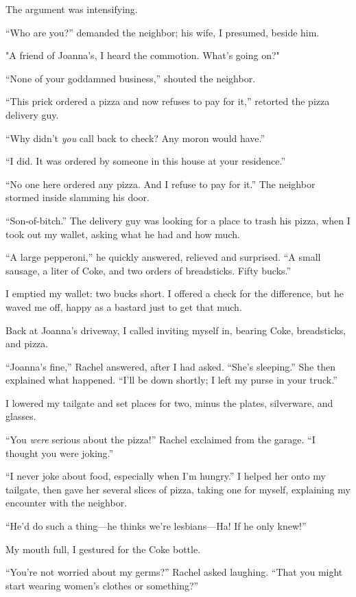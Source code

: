The argument was intensifying.

``Who are you?'' demanded the neighbor; his wife, I presumed, beside
him.

"A friend of Joanna's, I heard the commotion. What's going on?"

``None of your goddamned business,'' shouted the neighbor.

``This prick ordered a pizza and now refuses to pay for it,'' retorted
the pizza delivery guy.

``Why didn't \emph{you} call back to check? Any moron would have.''

``I did. It was ordered by someone in this house at your residence.''

``No one here ordered any pizza. And I refuse to pay for it.'' The
neighbor stormed inside slamming his door.

``Son-of-bitch.'' The delivery guy was looking for a place to trash his
pizza, when I took out my wallet, asking what he had and how much.

``A large pepperoni,'' he quickly answered, relieved and surprised. ``A
small sausage, a liter of Coke, and two orders of breadsticks. Fifty
bucks.''

I emptied my wallet: two bucks short. I offered a check for the
difference, but he waved me off, happy as a bastard just to get that
much.

Back at Joanna's driveway, I called inviting myself in, bearing Coke,
breadsticks, and pizza.

``Joanna's fine,'' Rachel answered, after I had asked. ``She's
sleeping.'' She then explained what happened. ``I'll be down shortly; I
left my purse in your truck.''

I lowered my tailgate and set places for two, minus the plates,
silverware, and glasses.

``You \emph{were} serious about the pizza!'' Rachel exclaimed from the
garage. ``I thought you were joking.''

``I never joke about food, especially when I'm hungry.'' I helped her
onto my tailgate, then gave her several slices of pizza, taking one for
myself, explaining my encounter with the neighbor.

``He'd do such a thing---he thinks we're lesbians---Ha! If he only
knew!''

My mouth full, I gestured for the Coke bottle.

``You're not worried about my germs?'' Rachel asked laughing. ``That you
might start wearing women's clothes or something?''

